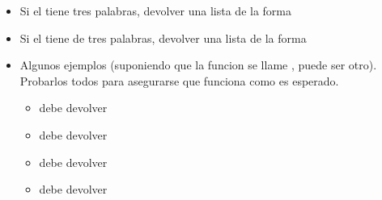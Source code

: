 \documentclass[a5paper,9pt,spanish]{sphinxmanual}
\begin{document}
\begin{itemize}
\begin{itemize}
\item {} 
\sphinxAtStartPar
Si el  tiene tres palabras, devolver una lista de la
forma 

\item {} 
\sphinxAtStartPar
Si el  tiene  de tres palabras, devolver una lista de la
forma 

\item {} 
\sphinxAtStartPar
Algunos ejemplos (suponiendo que la funcion se llame , puede ser otro).
Probarlos todos para asegurarse que funciona como es esperado.
\begin{itemize}
\item {} 
\sphinxAtStartPar
{} debe devolver 

\item {} 
\sphinxAtStartPar
{} debe devolver 

\item {} 
\sphinxAtStartPar
{} debe devolver 

\item {} 
\sphinxAtStartPar
{} debe devolver 

\end{itemize}

\end{itemize}

\end{itemize}
\end{document}
